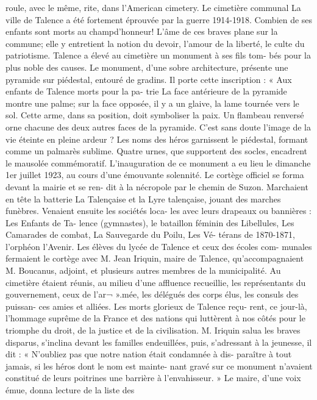 \documentclass[a4paper,11pt]{book}
\begin{document}
roule, avec le même, rite, dans l'American cimetery.
Le cimetière communal
La ville de Talence a été fortement éprouvée par la guerre
1914-1918. Combien de ses enfants sont morts au champd'honneur! L'âme de ces braves plane sur la commune; elle
y entretient la notion du devoir, l'amour de la liberté, le
culte du patriotisme.
Talence a élevé au cimetière un monument à ses fils tom-
bés pour la plus noble des causes.
Le monument, d'une sobre architecture, présente une
pyramide sur piédestal, entouré de gradins. Il porte cette
inscription : « Aux enfants de Talence morts pour la pa-
trie
La face antérieure de la pyramide montre une palme;
sur la face opposée, il y a un glaive, la lame tournée vers
le sol. Cette arme, dans sa position, doit symboliser la
paix. Un flambeau renversé orne chacune des deux autres
faces de la pyramide. C'est sans doute l'image de la vie
éteinte en pleine ardeur ?
Les noms des héros garnissent le piédestal, formant
comme un palmarès sublime. Quatre urnes, que supportent
des socles, encadrent le mausolée commémoratif.
L'inauguration de ce monument a eu lieu le dimanche
1er juillet 1923, au cours d'une émouvante solennité.
Le cortège officiel se forma devant la mairie et se ren-
dit à la nécropole par le chemin de Suzon. Marchaient en
tête la batterie La Talençaise et la Lyre talençaise, jouant
des marches funèbres. Venaient ensuite les sociétés loca-
les avec leurs drapeaux ou bannières : Les Enfants de Ta-
lence (gymnastes), le bataillon féminin des Libellules, Les
Camarades de combat, La Sauvegarde du Poilu, Les Vé-
térans de 1870-1871, l'orphéon l'Avenir.
Les élèves du lycée de Talence et ceux des écoles com-
munales fermaient le cortège avec M. Jean Iriquin, maire
de Talence, qu'accompagnaient M. Boucanus, adjoint, et
plusieurs autres membres de la municipalité.
Au cimetière étaient réunis, au milieu d'une affluence
recueillie, les représentants du gouvernement, ceux de l'ar¬
».mée, les délégués des corps élus, les consuls des puissan-
ces amies et alliées. Les morts glorieux de Talence reçu-
rent, ce jour-là, l'hommage suprême de la France et des
nations qui luttèrent à nos côtés pour le triomphe du droit,
de la justice et de la civilisation.
M. Iriquin salua les braves disparus, s'inclina devant
les familles endeuillées, puis, s'adressant à la jeunesse, il
dit :
« N'oubliez pas que notre nation était condamnée à dis-
paraître à tout jamais, si les héros dont le nom est mainte-
nant gravé sur ce monument n'avaient constitué de leurs
poitrines une barrière à l'envahisseur. »
Le maire, d'une voix émue, donna lecture de la liste des
\end{document}
